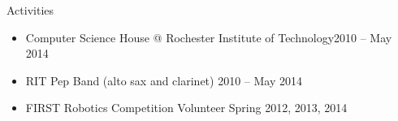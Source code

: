 \documentclass[10pt,oneside]{article}
\newenvironment{ressection}[1]{
	\vspace{3pt}
	{\fontfamily{bch}\selectfont\Large#1}
	\begin{itemize}
	\vspace{2pt}
}{
	\end{itemize}
}
\newcommand{\resitem}[1]{
	\vspace{-2pt}
	\item \begin{flushleft} #1 \end{flushleft}
}
\begin{document}
\begin{ressection}{Activities}

	\resitem{Computer Science House @ Rochester Institute of Technology\hfill 2010 -- May 2014}
	\resitem{RIT Pep Band (alto sax and clarinet) \hfill 2010 -- May 2014}
	\resitem{FIRST Robotics Competition Volunteer \hfill Spring 2012, 2013, 2014}

\end{ressection}
\end{document}

